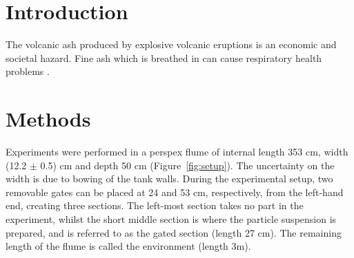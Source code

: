 \documentclass[authoryear,preprint,review,12pt]{elsarticle}
\begin{document}
\begin{frontmatter}
\begin{keyword}



\end{keyword}

\end{frontmatter}


\section{Introduction}
\label{sec:intro}

The volcanic ash produced by explosive volcanic eruptions is an economic and societal hazard. Fine ash which is breathed in can cause respiratory health problems \citep{Baxter15}.  
\section{Methods}
\label{sec:method}

Experiments were performed in a perspex flume of internal length 353 cm, width (12.2 $\pm$ 0.5) cm and depth 50 cm (Figure~\ref{fig:setup}). The uncertainty on the width is due to bowing of the tank walls. During the experimental setup, two removable gates can be placed at 24 and 53 cm, respectively, from the left-hand end, creating three sections. The left-most section takes no part in the experiment, whilst the short middle section is where the particle suspension is prepared, and is referred to as the gated section (length 27 cm). The remaining length of the flume is called the environment (length 3m).
\end{document}
